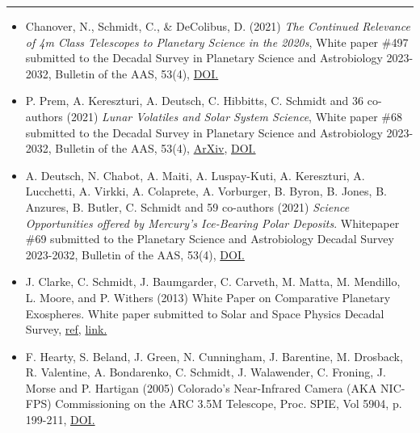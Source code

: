 \documentclass[12pt]{report}
\begin{document}
\rule{\textwidth}{1pt}
 \begin{itemize} \itemsep -2pt %

  \item Chanover, N., Schmidt, C., \& DeColibus, D. (2021) \textit{ The Continued Relevance of 4m Class Telescopes to Planetary Science in the 2020s}, White paper \#497 submitted to the Decadal Survey in Planetary Science and Astrobiology 2023-2032, Bulletin of the AAS, 53(4), \href{https://doi.org/10.3847/25c2cfeb.752e4fa4}{DOI.}
  \item P. Prem, A. Kereszturi, A. Deutsch, C. Hibbitts, C. Schmidt and 36 co-authors (2021) \textit{Lunar Volatiles and Solar System Science}, White paper \#68 submitted to the Decadal Survey in Planetary Science and Astrobiology 2023-2032, Bulletin of the AAS, 53(4), \href{https://arxiv.org/ftp/arxiv/papers/2012/2012.06317.pdf}{ArXiv}, \href{https://doi.org/10.3847/25c2cfeb.f62324b8}{DOI.}
  \item A. Deutsch, N. Chabot, A. Maiti, A. Luspay-Kuti, A. Kereszturi, A. Lucchetti, A. Virkki, A. Colaprete, A. Vorburger, B. Byron, B. Jones, B. Anzures, B. Butler, C. Schmidt and 59 co-authors (2021) \textit{Science Opportunities offered by Mercury’s Ice-Bearing Polar Deposits}. Whitepaper \#69 submitted to the Planetary Science and Astrobiology Decadal Survey 2023-2032, Bulletin of the AAS, 53(4), \href{https://doi.org/10.3847/25c2cfeb.98885a8e8}{DOI.} 
  \item J. Clarke, C. Schmidt, J. Baumgarder, C. Carveth, M. Matta, M. Mendillo, L. Moore, and P. Withers (2013) White Paper on Comparative Planetary Exospheres. White paper submitted to Solar and Space Physics Decadal Survey, 
\href{https://sites.nationalacademies.org/SSB/CurrentProjects/SSB_056864}{ref,}
\href{http://sirius.bu.edu/withers/pppp/pdf/clarkeheiodswp2010.pdf}{link.}
  \item F. Hearty, S. Beland, J. Green, N. Cunningham, J. Barentine, M. Drosback, R. Valentine, A. Bondarenko, C. Schmidt, J. Walawender, C. Froning, J. Morse and P. Hartigan (2005) Colorado's Near-Infrared Camera (AKA NIC-FPS) Commissioning on the ARC 3.5M Telescope, Proc. SPIE, Vol 5904, p. 199-211, \href{https://doi.org/10.1117/12.617593}{DOI.}
  \end{itemize}
\end{document}
